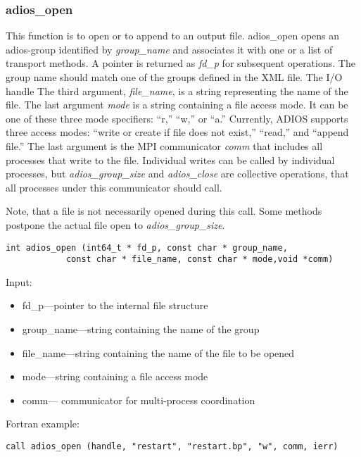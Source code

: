 \subsubsection{adios\_open}

This function is to open or to append to an output file. adios\_open
opens an adios-group identified by \textit{group\_name}
and associates it with one or a list of transport methods. 
A pointer is returned as \textit{fd\_p} for subsequent operations. 
The group name should match one of the groups defined in the XML file. The I/O handle 
The third argument, \textit{file\_name}, is a string representing the name of 
the file. 
The last argument \textit{mode} is a string containing a file access mode. 
It can be one of these three mode specifiers: ``r,'' ``w,'' or ``a.'' Currently, 
ADIOS supports three access modes: ``write or create if file does not exist,'' 
``read,'' and ``append file.'' 
The last argument is the MPI communicator \textit{comm} that includes all
processes that write to the file. Individual writes can be called by individual processes, but \textit{adios\_group\_size} and \textit{adios\_close} are collective operations, that all processes under this communicator should call. 

Note, that a file is not necessarily opened during this call. Some methods postpone the actual file open to \textit{adios\_group\_size}.

\begin{lstlisting}[alsolanguage=C]
int adios_open (int64_t * fd_p, const char * group_name,
	        const char * file_name, const char * mode,void *comm)
\end{lstlisting}

Input: 
\begin{itemize}
\item fd\_p---pointer to the internal file structure
\item group\_name---string containing the name of the group 
\item file\_name---string containing the name of the file to be opened 
\item mode---string containing  a file access mode
\item comm--- communicator for multi-process coordination
\end{itemize}

Fortran example: 
\begin{lstlisting}[alsolanguage=Fortran]
call adios_open (handle, "restart", "restart.bp", "w", comm, ierr)
\end{lstlisting}

